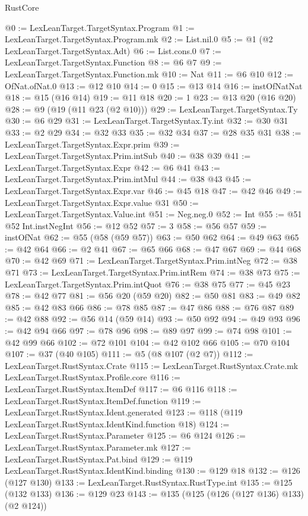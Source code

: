 \begin{lexlean}{RustCore}
\begin{coremodule}
@0 := LexLeanTarget.TargetSyntax.Program
@1 := LexLeanTarget.TargetSyntax.Program.mk
@2 := List.nil.{0}
@5 := @1 (@2 LexLeanTarget.TargetSyntax.Adt)
@6 := List.cons.{0}
@7 := LexLeanTarget.TargetSyntax.Function
@8 := @6 @7
@9 := LexLeanTarget.TargetSyntax.Function.mk
@10 := Nat
@11 := @6 @10
@12 := OfNat.ofNat.{0}
@13 := @12 @10
@14 := 0
@15 := @13 @14
@16 := instOfNatNat
@18 := @15 (@16 @14)
@19 := @11 @18
@20 := 1
@23 := @13 @20 (@16 @20)
@28 := @9 (@19 (@11 @23 (@2 @10)))
@29 := LexLeanTarget.TargetSyntax.Ty
@30 := @6 @29
@31 := LexLeanTarget.TargetSyntax.Ty.int
@32 := @30 @31
@33 := @2 @29
@34 := @32 @33
@35 := @32 @34
@37 := @28 @35 @31
@38 := LexLeanTarget.TargetSyntax.Expr.prim
@39 := LexLeanTarget.TargetSyntax.Prim.intSub
@40 := @38 @39
@41 := LexLeanTarget.TargetSyntax.Expr
@42 := @6 @41
@43 := LexLeanTarget.TargetSyntax.Prim.intMul
@44 := @38 @43
@45 := LexLeanTarget.TargetSyntax.Expr.var
@46 := @45 @18
@47 := @42 @46
@49 := LexLeanTarget.TargetSyntax.Expr.value @31
@50 := LexLeanTarget.TargetSyntax.Value.int
@51 := Neg.neg.{0}
@52 := Int
@55 := @51 @52 Int.instNegInt
@56 := @12 @52
@57 := 3
@58 := @56 @57
@59 := instOfNat
@62 := @55 (@58 (@59 @57))
@63 := @50 @62
@64 := @49 @63
@65 := @42 @64
@66 := @2 @41
@67 := @65 @66
@68 := @47 @67
@69 := @44 @68
@70 := @42 @69
@71 := LexLeanTarget.TargetSyntax.Prim.intNeg
@72 := @38 @71
@73 := LexLeanTarget.TargetSyntax.Prim.intRem
@74 := @38 @73
@75 := LexLeanTarget.TargetSyntax.Prim.intQuot
@76 := @38 @75
@77 := @45 @23
@78 := @42 @77
@81 := @56 @20 (@59 @20)
@82 := @50 @81
@83 := @49 @82
@85 := @42 @83 @66
@86 := @78 @85
@87 := @47 @86
@88 := @76 @87
@89 := @42 @88
@92 := @56 @14 (@59 @14)
@93 := @50 @92
@94 := @49 @93
@96 := @42 @94 @66
@97 := @78 @96
@98 := @89 @97
@99 := @74 @98
@101 := @42 @99 @66
@102 := @72 @101
@104 := @42 @102 @66
@105 := @70 @104
@107 := @37 (@40 @105)
@111 := @5 (@8 @107 (@2 @7))
@112 := LexLeanTarget.RustSyntax.Crate
@115 := LexLeanTarget.RustSyntax.Crate.mk LexLeanTarget.RustSyntax.Profile.core
@116 := LexLeanTarget.RustSyntax.ItemDef
@117 := @6 @116
@118 := LexLeanTarget.RustSyntax.ItemDef.function
@119 := LexLeanTarget.RustSyntax.Ident.generated
@123 := @118 (@119 LexLeanTarget.RustSyntax.IdentKind.function @18)
@124 := LexLeanTarget.RustSyntax.Parameter
@125 := @6 @124
@126 := LexLeanTarget.RustSyntax.Parameter.mk
@127 := LexLeanTarget.RustSyntax.Pat.bind
@129 := @119 LexLeanTarget.RustSyntax.IdentKind.binding
@130 := @129 @18
@132 := @126 (@127 @130)
@133 := LexLeanTarget.RustSyntax.RustType.int
@135 := @125 (@132 @133)
@136 := @129 @23
@143 := @135 (@125 (@126 (@127 @136) @133) (@2 @124))

\end{coremodule}
\end{lexlean}
